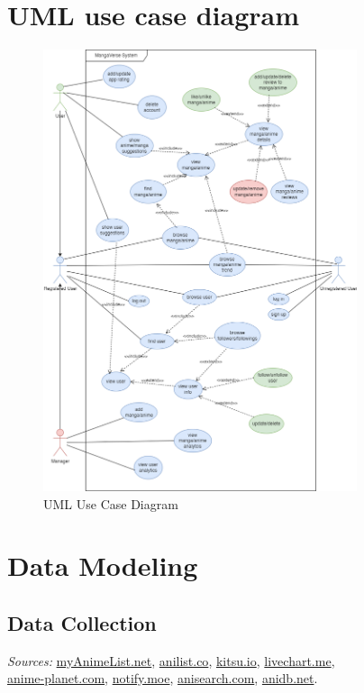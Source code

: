 \newpage

\section{UML use case diagram}

\begin{figure}[h]
    \centering
    \includegraphics[width=0.82\textwidth]{Media/useCase.png}
    \caption{UML Use Case Diagram}\label{uml use case diagram}
\end{figure}

\newpage

\section{Data Modeling}

\subsection{Data Collection}

\textit{Sources:}
\href{https://myanimelist.net/}{myAnimeList.net}, 
\href{https://anilist.co/}{anilist.co},
\href{https://kitsu.io/}{kitsu.io},
\href{https://livechart.me/}{livechart.me}, \\
\href{https://anime-planet.com/}{anime-planet.com},
\href{https://notify.moe/}{notify.moe},
\href{https://anisearch.com/}{anisearch.com},
\href{https://anidb.net/}{anidb.net}.

